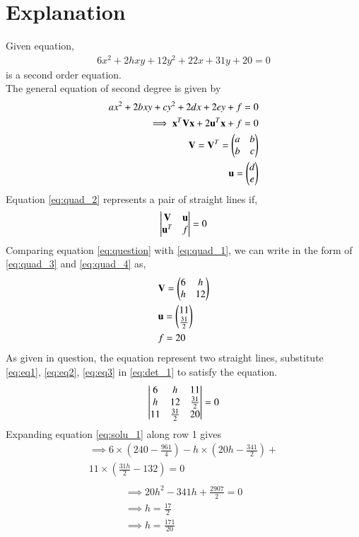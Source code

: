 \documentclass[journal,12pt,twocolumn]{IEEEtran}
\begin{document}
\section{Explanation}
Given equation,
\begin{align}
6x^2+2hxy+12y^2+22x+31y+20=0 \label{eq:question}
\end{align}
is a second order equation.\\
The general equation of second degree is given by
\begin{align}
    ax^2+2bxy+cy^2+2dx+2ey+f=0\label{eq:quad_1}\\
    \implies \mathbf{x}^T\mathbf{V}\mathbf{x}+2\mathbf{u}^T\mathbf{x}+f=0 \label{eq:quad_2}\\
    \mathbf{V}=\mathbf{V}^T=\begin{pmatrix}a & b \\ b & c\end{pmatrix} \label{eq:quad_3}\\
    \mathbf{u}=\begin{pmatrix}d \\ e\end{pmatrix} \label{eq:quad_4}
\end{align}
Equation \eqref{eq:quad_2} represents a pair of straight lines if,
\begin{align}
\begin{vmatrix}\mathbf{V} & \mathbf{u}\\\mathbf{u}^T & f\end{vmatrix}=0 \label{eq:det_1}
\end{align}
Comparing equation \eqref{eq:question} with \eqref{eq:quad_1}, we can write in the form of \eqref{eq:quad_3} and \eqref{eq:quad_4} as,
\begin{align}
    &\mathbf{V}=\begin{pmatrix}6 & h \\ h & 12\end{pmatrix} \label{eq:eq1}\\ 
    &\mathbf{u}=\begin{pmatrix}11 \\ \frac{31}{2}\end{pmatrix}  \label{eq:eq2}\\
    & f=20 \label{eq:eq3}
\end{align}
As given in question, the equation represent two straight lines, substitute \eqref{eq:eq1}, \eqref{eq:eq2}, \eqref{eq:eq3} in \eqref{eq:det_1} to satisfy the equation.
\begin{align}
    \begin{vmatrix}6 & h & 11\\h & 12 & \frac{31}{2}\\11&\frac{31}{2} & 20\end{vmatrix} = 0 \label{eq:solu_1}
\end{align}
Expanding equation \eqref{eq:solu_1} along row 1 gives
\begin{multline*}
\implies 6\times(240 - \frac{961}{4}) -h\times(20h - \frac{341}{2}) +\\ 11\times(\frac{31h}{2}-132) = 0\\
\end{multline*}
\begin{align}
\implies 20h^{2}-341h+\frac{2907}{2} = 0\\
\implies \boxed{h=\frac{17}{2}} \label{eq:result1}\\
\implies \boxed{h=\frac{171}{20}} \label{eq:result2}
\end{align}
\end{document}
